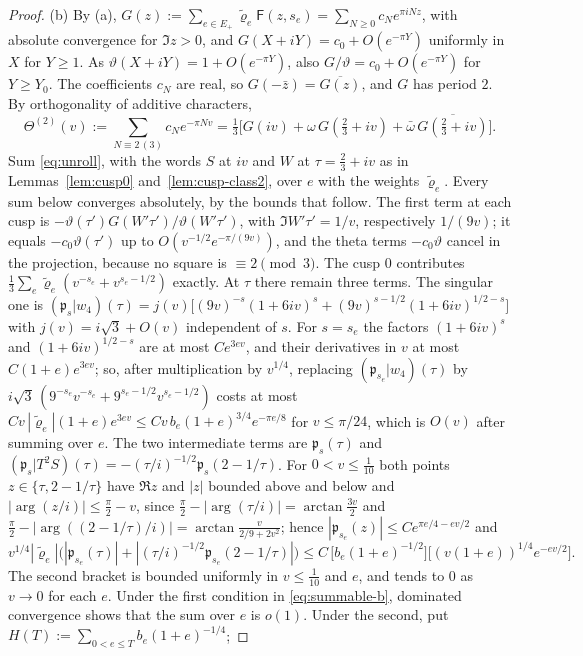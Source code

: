 \begin{proof}
(b) By (a), $G(z):=\sum_{e\in E_+}\tilde\varrho_e\mathsf F(z,s_e)=\sum_{N\ge0}c_Ne^{\pi iNz}$, with absolute convergence for $\Im z>0$, and
$G(X+iY)=c_0+O(e^{-\pi Y})$ uniformly in $X$ for $Y\ge1$. As $\vartheta(X+iY)=1+O(e^{-\pi Y})$, also $G/\vartheta=c_0+O(e^{-\pi Y})$ for $Y\ge Y_0$.
The coefficients $c_N$ are real, so $G(-\bar z)=\overline{G(z)}$, and $G$ has period $2$. By orthogonality of additive characters,
\[
\Theta^{(2)}(v):=\sum_{N\equiv2\,(3)}c_Ne^{-\pi Nv}=\tfrac13\Big[G(iv)+\omega\,G(\tfrac23+iv)+\bar\omega\,\overline{G(\tfrac23+iv)}\Big].
\]
Sum \eqref{eq:unroll}, with the words $S$ at $iv$ and $W$ at $\tau=\frac23+iv$ as in Lemmas~\ref{lem:cusp0} and~\ref{lem:cusp-class2}, over $e$ with
the weights $\tilde\varrho_e$. Every sum below converges absolutely, by the bounds that follow. The first term at each cusp is
$-\vartheta(\tau')G(W'\tau')/\vartheta(W'\tau')$, with $\Im W'\tau'=1/v$, respectively $1/(9v)$; it equals $-c_0\vartheta(\tau')$ up to
$O(v^{-1/2}e^{-\pi/(9v)})$, and the theta terms $-c_0\vartheta$ cancel in the projection, because no square is $\equiv2\pmod3$. The cusp $0$
contributes $\frac13\sum_e\tilde\varrho_e(v^{-s_e}+v^{s_e-1/2})$ exactly. At $\tau$ there remain three terms. The singular one is
$(\mathfrak p_s|w_4)(\tau)=j(v)\big[(9v)^{-s}(1+6iv)^s+(9v)^{s-1/2}(1+6iv)^{1/2-s}\big]$ with $j(v)=i\sqrt3+O(v)$ independent of $s$. For $s=s_e$ the
factors $(1+6iv)^{s}$ and $(1+6iv)^{1/2-s}$ are at most $Ce^{3ev}$, and their derivatives in $v$ at most $C(1+e)e^{3ev}$; so, after multiplication by
$v^{1/4}$, replacing $(\mathfrak p_{s_e}|w_4)(\tau)$ by $i\sqrt3\,(9^{-s_e}v^{-s_e}+9^{s_e-1/2}v^{s_e-1/2})$ costs at most
$Cv\,|\tilde\varrho_e|(1+e)e^{3ev}\le Cv\,b_e(1+e)^{3/4}e^{-\pi e/8}$ for $v\le\pi/24$, which is $O(v)$ after summing over $e$. The two intermediate
terms are $\mathfrak p_s(\tau)$ and $(\mathfrak p_s|T^2S)(\tau)=-(\tau/i)^{-1/2}\mathfrak p_s(2-1/\tau)$. For $0<v\le\frac1{10}$ both points
$z\in\{\tau,2-1/\tau\}$ have $\Re z$ and $|z|$ bounded above and below and $|\arg(z/i)|\le\frac\pi2-v$, since
$\frac\pi2-|\arg(\tau/i)|=\arctan\frac{3v}2$ and $\frac\pi2-|\arg((2-1/\tau)/i)|=\arctan\frac v{2/9+2v^2}$; hence $|\mathfrak p_{s_e}(z)|\le Ce^{\pi e/4-ev/2}$
and
\[
v^{1/4}|\tilde\varrho_e|\big(|\mathfrak p_{s_e}(\tau)|+|(\tau/i)^{-1/2}\mathfrak p_{s_e}(2-1/\tau)|\big)\le C\,\big[b_e(1+e)^{-1/2}\big]\big[(v(1+e))^{1/4}e^{-ev/2}\big].
\]
The second bracket is bounded uniformly in $v\le\frac1{10}$ and $e$, and tends to $0$ as $v\to0$ for each $e$. Under the first condition in
\eqref{eq:summable-b}, dominated convergence shows that the sum over $e$ is $o(1)$. Under the second, put $H(T):=\sum_{0<e\le T}b_e(1+e)^{-1/4}$;

\end{proof}
